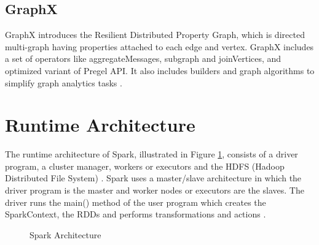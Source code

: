 \documentclass[9pt,twocolumn,twoside]{styles/osajnl}
\begin{document}
\subsection{GraphX}

GraphX introduces the Resilient Distributed Property
Graph, which is directed multi-graph having properties
attached to each edge and vertex. GraphX includes a set of
operators like aggregateMessages, subgraph and
joinVertices, and optimized variant of Pregel API. It also
includes builders and graph algorithms to simplify graph
analytics tasks \cite{article-spark-1}.

\section{Runtime Architecture}

The runtime architecture of Spark,  illustrated in Figure \ref{fig:spark-runtime}, consists of a driver program, a cluster manager, workers or executors and the HDFS (Hadoop Distributed File System) \cite{article-spark-1}.
Spark uses a master/slave architecture in which the driver program is the master and worker nodes or executors are the slaves. The driver runs the main() method of the user program which creates  the SparkContext, the RDDs and performs transformations and actions \cite{book-spark}.

\begin{figure}[htbp]
\centering
{}
\caption{Spark Architecture \cite{www-spark-cluster}}
\label{fig:spark-runtime}
\end{figure}
\end{document}
